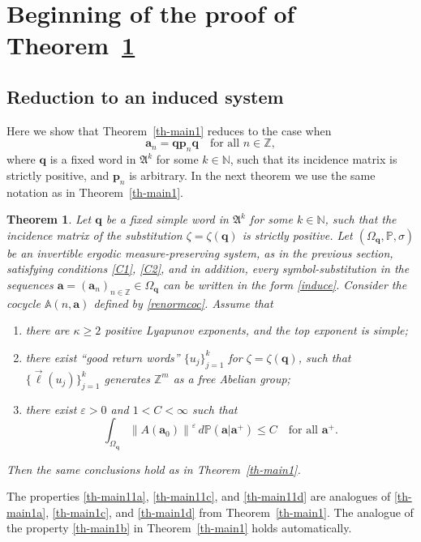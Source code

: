 \documentclass[JEP,XML,SOM,Unicode]{cedram}
\theoremstyle{plain}
\newtheorem{theorem}{Theorem}[section]
\theoremstyle{definition}
\newcommand\bom{{\boldsymbol a}}\let\ba\bom
\newcommand\bp{{\boldsymbol p}}
\newcommand\bq{{\boldsymbol q}}
\let\eps\varepsilon
\let\Om\Omega
\let\sig\sigma
\newcommand\FrA{\mathfrak{A}}
\newcommand\Aa{\mathbb{A}}
\newcommand{\Z}{\mathbb{Z}}
\newcommand{\N}{\mathbb{N}}
\renewcommand{\P}{\mathbb{P}}
\newcommand\be{\begin{equation}}
\newcommand\ee{\end{equation}}
\begin{document}
\section{Beginning of the proof of Theorem~\ref{th-main11}}\label{sec:4}
\subsection{Reduction to an induced system}

Here we show that Theorem~\ref{th-main1} reduces to the case when
\be \label{induce}
\bom_n = \bq \bp_n \bq\quad \text{for all }n\in \Z,
\ee
where $\bq$ is a fixed word in $\FrA^k$ for some $k\in \N$, such that its incidence matrix is strictly positive, and $\bp_n$ is arbitrary. In the next theorem we use the same notation as in Theorem~\ref{th-main1}.

\begin{theorem} \label{th-main11}
Let $\bq$ be a fixed simple word in $\FrA^k$ for some $k\in \N$, such that the incidence matrix of the substitution $\zeta = \zeta(\bq)$ is strictly positive.
Let $(\Om_\bq,\P,\sig)$ be an invertible ergodic measure-preserving system, as in the previous section, satisfying conditions \eqref{C1}, \eqref{C2}, and in addition, every symbol-substitution in the sequences $\ba=(\ba_n)_{n\in \Z} \in \Om_\bq$ can be written in the form \eqref{induce}.
Consider the cocycle $\Aa(n,\bom)$ defined by \eqref{renormcoc}. Assume that
\begin{enumerate}\renewcommand{\theenumi}{\alph{enumi}$'$}
\item\label{th-main11a}
there are $\kappa\ge 2$ positive Lyapunov exponents,
and the top exponent is simple;
\item\label{th-main11c}
there exist ``good return words'' $\{u_j\}_{j=1}^k$ for $\zeta=\zeta(\bq)$, such that $\{\vec{\ell}(u_j)\}_{j=1}^k$ generates $\Z^m$ as a free Abelian group;
\item\label{th-main11d}
there exist $\eps>0$ and $1<C<\infty$ such that
\be \label{eq-star11}
\int_{\Om_\bq} \left\|A(\bom_0)\right\|^\eps\,d\P(\bom|\bom^+) \le C\quad \text{for all }\bom^+.
\ee
\end{enumerate}
Then the same conclusions hold as in Theorem~\ref{th-main1}.
\end{theorem}

The properties \eqref{th-main11a}, \eqref{th-main11c}, and \eqref{th-main11d} are analogues of \eqref{th-main1a}, \eqref{th-main1c}, and \eqref{th-main1d} from Theorem~\ref{th-main1}. The analogue of the property \eqref{th-main1b} in Theorem~\ref{th-main1} holds automatically.
\end{document}
